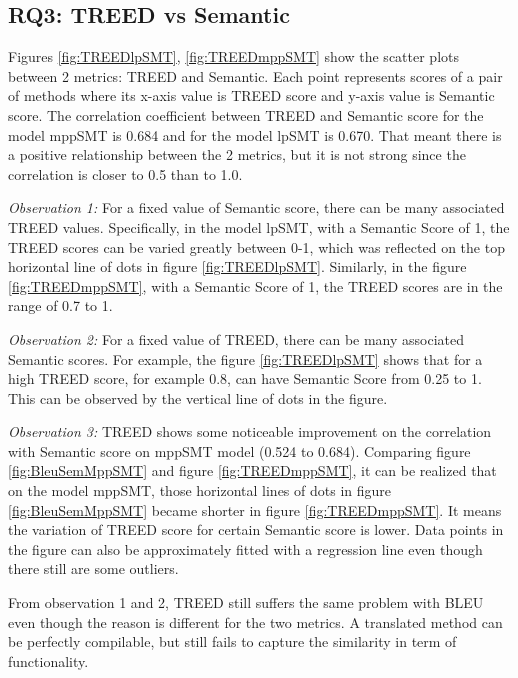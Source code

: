 \subsection{RQ3: TREED vs Semantic}
Figures \ref{fig:TREEDlpSMT}, \ref{fig:TREEDmppSMT}  show the scatter plots between 2 metrics: TREED and Semantic. Each point represents scores of a pair of methods where its x-axis value is TREED score and y-axis value is Semantic score.
The correlation coefficient between TREED and Semantic score for the model mppSMT is 0.684 and for the model lpSMT is 0.670. That meant there is a positive relationship between the 2 metrics, but it is not strong since the correlation is closer to 0.5 than to 1.0.

\emph{Observation 1:} For a fixed value of Semantic score, there can be many associated TREED values. Specifically, in the model lpSMT, with a Semantic Score of 1, the TREED scores can be varied greatly between 0-1, which was reflected on the top horizontal line of dots in figure \ref{fig:TREEDlpSMT}. Similarly, in the figure \ref{fig:TREEDmppSMT}, with a Semantic Score of 1, the TREED scores are in the range of 0.7 to 1. 

\emph{Observation 2:} For a fixed value of TREED, there can be many associated Semantic scores. For example, the figure \ref{fig:TREEDlpSMT} shows that for a high TREED score, for example 0.8, can have Semantic Score from 0.25 to 1. This can be observed by the vertical line of dots in the figure. 

\emph{Observation 3:} TREED shows some noticeable improvement on the correlation with Semantic score on mppSMT model (0.524 to 0.684). Comparing figure \ref{fig:BleuSemMppSMT} and figure \ref{fig:TREEDmppSMT}, it can be realized that on the model mppSMT, those horizontal lines of dots in figure \ref{fig:BleuSemMppSMT} became shorter in figure \ref{fig:TREEDmppSMT}. It means the variation of TREED score for certain Semantic score is lower. Data points in the figure can also be approximately fitted with a regression line even though there still are some outliers. 

From observation 1 and 2, TREED still suffers the same problem with BLEU even though the reason is different for the two metrics. A translated method can be perfectly compilable, but still fails to capture the similarity in term of functionality. 

